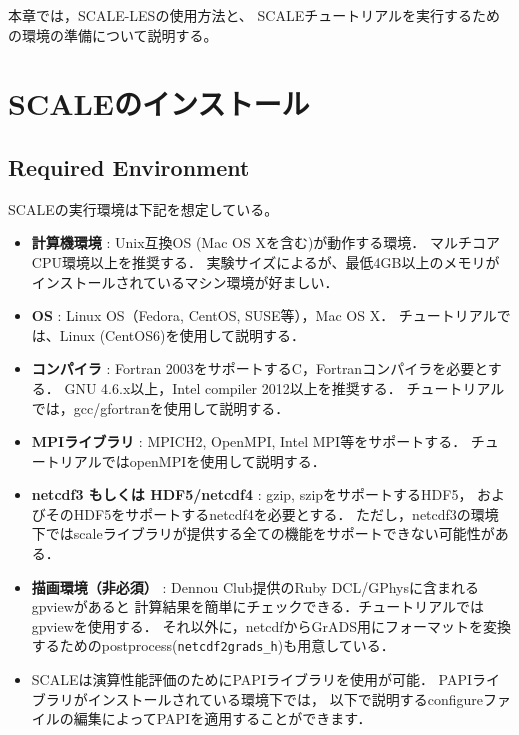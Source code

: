 本章では，SCALE-LESの使用方法と、
SCALEチュートリアルを実行するための環境の準備について説明する。

\section{SCALEのインストール}

\subsection{Required Environment}
\label{sec:req_env}
SCALEの実行環境は下記を想定している。

\begin{itemize}
  \item {\bf 計算機環境} : Unix互換OS (Mac OS Xを含む)が動作する環境．
        マルチコアCPU環境以上を推奨する．
        実験サイズによるが、最低4GB以上のメモリが
        インストールされているマシン環境が好ましい．
  \item {\bf OS} : Linux OS（Fedora, CentOS, SUSE等），Mac OS X．
        チュートリアルでは、Linux (CentOS6)を使用して説明する．
  \item {\bf コンパイラ} : Fortran 2003をサポートするC，Fortranコンパイラを必要とする．
        GNU 4.6.x以上，Intel compiler 2012以上を推奨する．
        チュートリアルでは，gcc/gfortranを使用して説明する．
  \item {\bf MPIライブラリ} : MPICH2, OpenMPI, Intel MPI等をサポートする．
        チュートリアルではopenMPIを使用して説明する．
  \item {\bf netcdf3 もしくは HDF5/netcdf4} : gzip, szipをサポートするHDF5，
        およびそのHDF5をサポートするnetcdf4を必要とする．
        ただし，netcdf3の環境下ではscaleライブラリが提供する全ての機能をサポートできない可能性がある．
  \item {\bf 描画環境（非必須）} : Dennou Club提供のRuby DCL/GPhysに含まれるgpviewがあると
        計算結果を簡単にチェックできる．チュートリアルではgpviewを使用する．
        それ以外に，netcdfからGrADS用にフォーマットを変換するためのpostprocess(\verb|netcdf2grads_h|)も用意している．
  \item SCALEは演算性能評価のためにPAPIライブラリを使用が可能．
        PAPIライブラリがインストールされている環境下では，
        以下で説明するconfigureファイルの編集によってPAPIを適用することができます．
\end{itemize}




